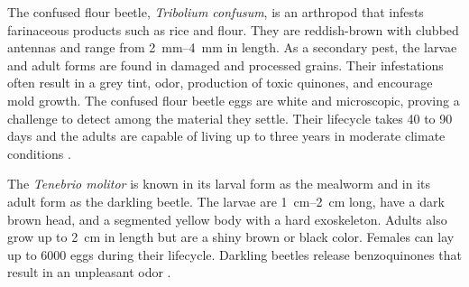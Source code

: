 The confused flour beetle, \textit{Tribolium confusum}, is an arthropod that infests farinaceous products such as rice and flour. They are reddish-brown with clubbed antennas and range from \SIrange{2}{4}{\milli\meter} in length. As a secondary pest, the larvae and adult forms are found in damaged and processed grains. Their infestations often result in a grey tint, odor, production of toxic quinones, and encourage mold growth. The confused flour beetle eggs are white and microscopic, proving a challenge to detect among the material they settle. Their lifecycle takes 40 to 90 days and the adults are capable of living up to three years in moderate climate conditions \cite{mohamedn.sallamInsectDamagePostHarvest2013, baldwinConfusedFlourBeetle2020}.

The \textit{Tenebrio molitor} is known in its larval form as the mealworm and in its adult form as the darkling beetle. The larvae are \SIrange{1}{2}{\centi\meter} long, have a dark brown head, and a segmented yellow body with a hard exoskeleton. Adults also grow up to \SI{2}{\centi\meter} in length but are a shiny brown or black color. Females can lay up to 6000 eggs during their lifecycle. Darkling beetles release benzoquinones that result in an unpleasant odor \cite{mohamedn.sallamInsectDamagePostHarvest2013, vigneronImmuneDefensesBeneficial2019}.


